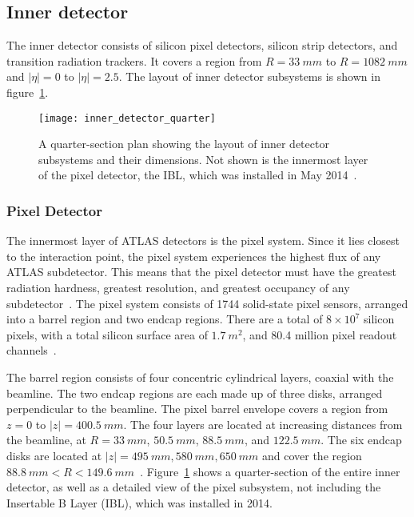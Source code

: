 \subsection{Inner detector}\label{subsec:inner_detector}
The inner detector consists of silicon pixel detectors, silicon strip detectors, and transition radiation trackers.
It covers a region from $R = 33~mm$ to $R = 1082~mm$ and $|\eta| = 0$ to $|\eta| = 2.5$.
The layout of inner detector subsystems is shown in figure~\ref{fig:inner_detector_quarter}.

\begin{figure}[!ht]\centering
\texttt{[image: inner\_detector\_quarter]}
\caption{A quarter-section plan showing the layout of inner detector subsystems and their dimensions.
Not shown is the innermost layer of the pixel detector, the IBL, which was installed in May 2014~\cite{lhc-machine-2008}.}
\label{fig:inner_detector_quarter}
\end{figure}

\subsubsection{Pixel Detector}\label{subsubsec:pixel}

The innermost layer of ATLAS detectors is the pixel system.
Since it lies closest to the interaction point, the pixel system experiences the highest flux of any ATLAS subdetector.
This means that the pixel detector must have the greatest radiation hardness, greatest resolution,
and greatest occupancy of any subdetector~\cite{atlas-detector-2008}.
The pixel system consists of 1744 solid-state pixel sensors, arranged into a barrel region and two endcap regions.
There are a total of $8\times10^7$ silicon pixels, with a total silicon surface area of $1.7~m^2$, and 80.4 million pixel readout channels~\cite{atlas-detector-2008}.

The barrel region consists of four concentric cylindrical layers, coaxial with the beamline.
The two endcap regions are each made up of three disks, arranged perpendicular to the beamline.
The pixel barrel envelope covers a region from $z = 0$ to $|z|  = 400.5~mm$.
The four layers are located at increasing distances from the beamline, at $R = 33~mm$, $50.5~mm$, $88.5~mm$, and $122.5~mm$.
The six endcap disks are located at $|z| = 495~mm, 580~mm, 650~mm$ and cover the region $88.8~mm < R < 149.6~mm$~\cite{atlas-detector-2008}.
Figure~\ref{fig:inner_detector_quarter} shows a quarter-section of the entire inner detector, as well as a detailed view of the pixel subsystem, not including the Insertable B Layer (IBL), which was installed in 2014.

